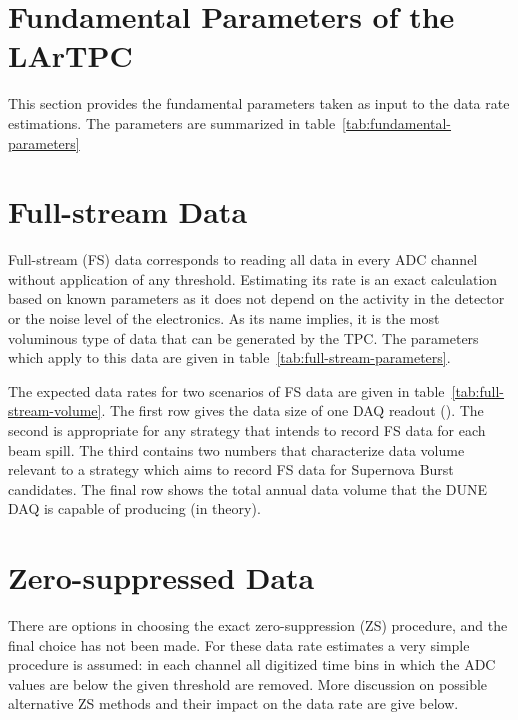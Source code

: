 \section{Fundamental Parameters of the LArTPC}

This section provides the fundamental parameters taken as input to the
data rate estimations.
The parameters are summarized in
table~\ref{tab:fundamental-parameters}



\section{Full-stream Data}

Full-stream (FS) data corresponds to reading all data in every ADC channel without application of any threshold.
Estimating its rate is an exact calculation based on known parameters as it does not depend on
the activity in the detector or the noise level of the electronics.
As its name implies, it is the most voluminous type of data that can be generated by the TPC.
The parameters which apply to this data are given in table~\ref{tab:full-stream-parameters}.



The expected data rates for two scenarios of FS data are given
in table~\ref{tab:full-stream-volume}.
The first row gives the data size of one DAQ readout (\daqreadouttime).
The second is appropriate for any strategy that intends to record FS
data for each beam spill.
The third contains two numbers that characterize data volume relevant to a strategy which aims to record FS data
for Supernova Burst candidates.
The final row  shows the total annual data volume that the DUNE DAQ is capable of producing (in theory).




\section{Zero-suppressed Data}

There are options in choosing the exact zero-suppression (ZS) procedure,
and the final choice has not been made.
For these data rate estimates a very simple procedure is assumed: in each
channel all digitized time bins in which the ADC values are below
the given threshold are removed.
More discussion on possible alternative ZS methods and their impact on
the data rate are give below.

